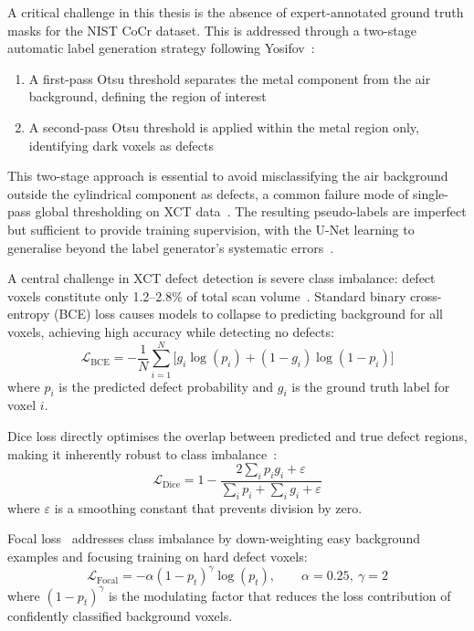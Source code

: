 A critical challenge in this thesis is the absence of expert-annotated ground truth masks for the
NIST CoCr dataset. This is addressed through a two-stage automatic label generation strategy
following Yosifov~\citep{Yosifov2020}:
\begin{enumerate}
\item A first-pass Otsu threshold separates the metal component from the air background, defining
  the region of interest
\item A second-pass Otsu threshold is applied within the metal region only, identifying dark voxels
  as defects
\end{enumerate}
This two-stage approach is essential to avoid misclassifying the air background outside the
cylindrical component as defects, a common failure mode of single-pass global thresholding on XCT
data~\citep{Otsu1979}. The resulting pseudo-labels are imperfect but sufficient to provide training
supervision, with the U-Net learning to generalise beyond the label generator's systematic
errors~\citep{Yosifov2020}.

A central challenge in XCT defect detection is severe class imbalance: defect voxels constitute only
1.2--2.8\% of total scan volume~\citep{Sudre2017}. Standard binary cross-entropy (BCE) loss causes
models to collapse to predicting background for all voxels, achieving high accuracy while detecting
no defects:
\begin{equation}
\mathcal{L}_{\mathrm{BCE}} = -\frac{1}{N} \sum_{i=1}^{N}
\Big[ g_i \log(p_i) + (1 - g_i) \log(1 - p_i) \Big]
\label{eq:bce}
\end{equation}
where $p_i$ is the predicted defect probability and $g_i$ is the ground truth label for voxel $i$.

Dice loss directly optimises the overlap between predicted and true defect regions, making it
inherently robust to class imbalance~\citep{Sudre2017}:
\begin{equation}
\mathcal{L}_{\mathrm{Dice}} = 1 -
\frac{2 \sum_i p_i g_i + \varepsilon}{\sum_i p_i + \sum_i g_i + \varepsilon}
\label{eq:dice_loss}
\end{equation}
where $\varepsilon$ is a smoothing constant that prevents division by zero.

Focal loss~\citep{Lin2017} addresses class imbalance by down-weighting easy background examples and
focusing training on hard defect voxels:
\begin{equation}
\mathcal{L}_{\mathrm{Focal}} = -\alpha (1 - p_t)^{\gamma} \log(p_t),
\qquad \alpha = 0.25,\ \gamma = 2
\label{eq:focal_loss}
\end{equation}
where $(1 - p_t)^{\gamma}$ is the modulating factor that reduces the loss contribution of confidently
classified background voxels.

